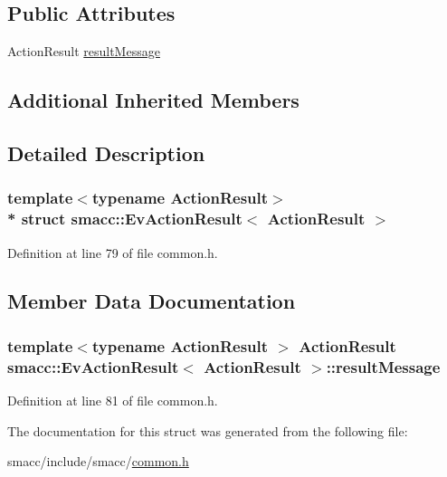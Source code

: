 \subsection*{Public Attributes}
\begin{DoxyCompactItemize}
\item 
Action\+Result \hyperlink{structsmacc_1_1EvActionResult_a769d1218e33213f72adc1eb72dd02e46}{result\+Message}
\end{DoxyCompactItemize}
\subsection*{Additional Inherited Members}


\subsection{Detailed Description}
\subsubsection*{template$<$typename Action\+Result$>$\\*
struct smacc\+::\+Ev\+Action\+Result$<$ Action\+Result $>$}



Definition at line 79 of file common.\+h.



\subsection{Member Data Documentation}
\subsubsection[{\texorpdfstring{result\+Message}{resultMessage}}]{\setlength{\rightskip}{0pt plus 5cm}template$<$typename Action\+Result $>$ Action\+Result {\bf smacc\+::\+Ev\+Action\+Result}$<$ Action\+Result $>$\+::result\+Message}\hypertarget{structsmacc_1_1EvActionResult_a769d1218e33213f72adc1eb72dd02e46}{}\label{structsmacc_1_1EvActionResult_a769d1218e33213f72adc1eb72dd02e46}


Definition at line 81 of file common.\+h.



The documentation for this struct was generated from the following file\+:\begin{DoxyCompactItemize}
\item 
smacc/include/smacc/\hyperlink{common_8h}{common.\+h}\end{DoxyCompactItemize}
